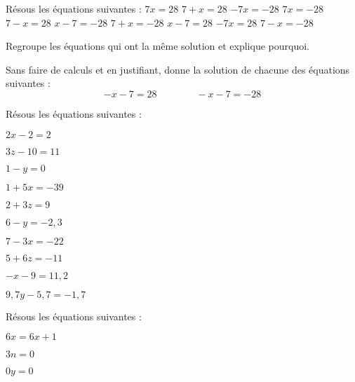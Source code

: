 \begin{exercice}

\begin{colenumerate}{1} 
\item Résous les équations suivantes :
    \subitem $7x = 28$
    \subitem $7 + x = 28$
    \subitem $-7x = -28$
    \subitem $7x = -28$
    \subitem $7 -x = 28$
    \subitem $x -7 = -28$
    \subitem $7 + x = -28$
    \subitem $x -7 = 28$
    \subitem $-7x = 28$
    \subitem $7 -x = -28$
\item Regroupe les équations qui ont la même solution et explique pourquoi.
\item Sans faire de calculs et en justifiant, donne la solution de chacune des équations suivantes :
\[ -x -7 = 28	\qquad \qquad 	-x -7 = -28 \]
\end{colenumerate} 
\end{exercice}




\begin{exercice}[Équations du type $ax + b = c$]

Résous les équations suivantes :

\begin{colenumerate}{2} 
\item $2x -2 = 2$
\item $3z -10 = 11$
\item $1 -y = 0$
\item $1 + 5x = -39$
\item $2 + 3z = 9$
\item $6 -y = -2,3$
\item $7 -3x = -22$
\item $5 + 6z = -11$
\item $-x -9 = 11,2$
\item $9,7y -5,7 = -1,7$
\end{colenumerate} 
\end{exercice}




\begin{exercice}

Résous les équations suivantes :

\begin{colenumerate}{3} 
\item $6x = 6x + 1$
\item $3n = 0$
\item $0y = 0$
\end{colenumerate}
\end{exercice}




